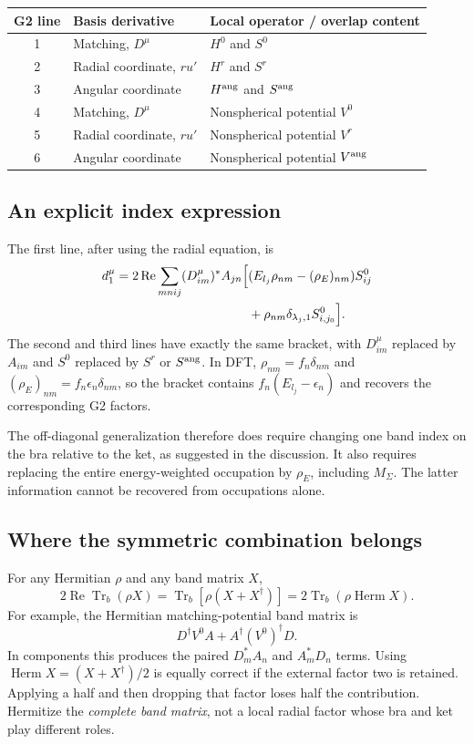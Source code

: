 \documentclass[11pt]{article}
\newcommand{\Tr}{\operatorname{Tr}}
\newcommand{\Rea}{\operatorname{Re}}
\newcommand{\Herm}{\operatorname{Herm}}
\newcommand{\rE}{{\rho_E}}
\begin{document}
\begin{tabularx}{\linewidth}{@{}c l X@{}}
\toprule
G2 line & Basis derivative & Local operator / overlap content\\
\midrule
1 & Matching, $D^\mu$ & $H^0$ and $S^0$\\
2 & Radial coordinate, $r u'$ & $H^r$ and $S^r$\\
3 & Angular coordinate & $H^{\rm ang}$ and $S^{\rm ang}$\\
4 & Matching, $D^\mu$ & Nonspherical potential $V^0$\\
5 & Radial coordinate, $r u'$ & Nonspherical potential $V^r$\\
6 & Angular coordinate & Nonspherical potential $V^{\rm ang}$\\
\bottomrule
\end{tabularx}

\subsection{An explicit index expression}
The first line, after using the radial equation, is
\begin{align}
 d_1^\mu=2\Rea\sum_{mnij}(D^\mu_{im})^*A_{jn}
 \Big[&(E_{l_j}\rho_{nm}-(\rE)_{nm})S^0_{ij}\notag\\
       &+\rho_{nm}\delta_{\lambda_j,1}S^0_{i,j_0}\Big].
 \label{eq:g21index}
\end{align}
The second and third lines have exactly the same bracket, with
$D^\mu_{im}$ replaced by $A_{im}$ and $S^0$ replaced by $S^r$ or
$S^{\rm ang}$. In DFT, $\rho_{nm}=f_n\delta_{nm}$ and
$(\rE)_{nm}=f_n\epsilon_n\delta_{nm}$, so the bracket contains
$f_n(E_{l_j}-\epsilon_n)$ and recovers the corresponding G2 factors.

The off-diagonal generalization therefore does require changing one
band index on the bra relative to the ket, as suggested in the discussion.
It also requires replacing the entire energy-weighted occupation by
$\rho_E$, including $M_\Sigma$. The latter information cannot be
recovered from occupations alone.

\subsection{Where the symmetric combination belongs}
For any Hermitian $\rho$ and any band matrix $X$,
\begin{equation}
 2\Rea\Tr_b(\rho X)=\Tr_b[\rho(X+X^\dagger)]
                         =2\Tr_b(\rho\Herm X).
 \label{eq:hermitize}
\end{equation}
For example, the Hermitian matching-potential band matrix is
\begin{equation}
 D^\dagger V^0A+A^\dagger(V^0)^\dagger D.
\end{equation}
In components this produces the paired $D_m^*A_n$ and $A_m^*D_n$
terms. Using $\Herm X=(X+X^\dagger)/2$ is equally correct if the
external factor two is retained. Applying a half and then dropping that
factor loses half the contribution. Hermitize the \emph{complete band
matrix}, not a local radial factor whose bra and ket play different roles.
\end{document}
